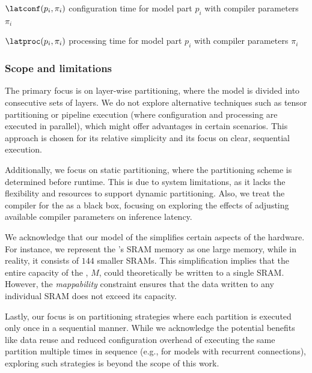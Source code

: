 \begin{eqexpl}[30mm]
    \item{$\latconf(p_i, \pi_i)$} configuration time for model part $p_i$ with compiler parameters $\pi_i$
    \item{$\latproc(p_i, \pi_i)$} processing time for model part $p_i$ with compiler parameters $\pi_i$
\end{eqexpl}

\subsubsection{Scope and limitations}
The primary focus is on layer-wise partitioning, where the model is divided into consecutive sets of layers.
We do not explore alternative techniques such as tensor partitioning or pipeline execution (where configuration and processing are executed in parallel), which might offer advantages in certain scenarios.
This approach is chosen for its relative simplicity and its focus on clear, sequential execution. 

Additionally, we focus on static partitioning, where the partitioning scheme is determined before runtime.
This is due to system limitations, as it lacks the flexibility and resources to support dynamic partitioning.
Also, we treat the compiler for the \graicore{} as a black box, focusing on exploring the effects of adjusting available compiler parameters on inference latency.

We acknowledge that our model of the \graicore{} simplifies certain aspects of the hardware.
For instance, we represent the \graicore{}'s SRAM memory as one large memory, while in reality, it consists of $144$ smaller SRAMs.
This simplification implies that the entire capacity of the \graicore{}, $M$, could theoretically be written to a single SRAM.
However, the \textit{mappability} constraint ensures that the data written to any individual SRAM does not exceed its capacity.

Lastly, our focus is on partitioning strategies where each partition is executed only once in a sequential manner.
While we acknowledge the potential benefits like data reuse and reduced configuration overhead of executing the same partition multiple times in sequence (e.g., for models with recurrent connections), exploring such strategies is beyond the scope of this work.

